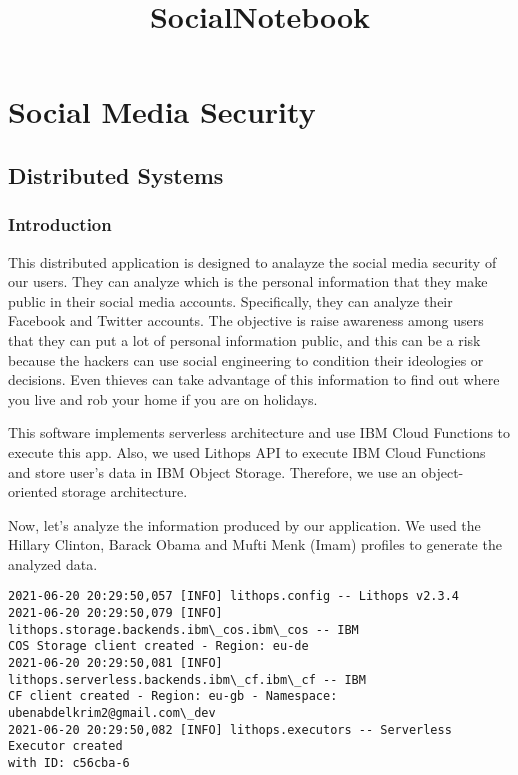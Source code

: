 \documentclass[11pt]{article}
\title{SocialNotebook}
\begin{document}
    
    \maketitle
    
    

    
    \hypertarget{social-media-security}{%
\section{Social Media Security}\label{social-media-security}}

\hypertarget{distributed-systems}{%
\subsection{Distributed Systems}\label{distributed-systems}}

\hypertarget{introduction}{%
\subsubsection{Introduction}\label{introduction}}

This distributed application is designed to analayze the social media
security of our users. They can analyze which is the personal
information that they make public in their social media accounts.
Specifically, they can analyze their Facebook and Twitter accounts. The
objective is raise awareness among users that they can put a lot of
personal information public, and this can be a risk because the hackers
can use social engineering to condition their ideologies or decisions.
Even thieves can take advantage of this information to find out where
you live and rob your home if you are on holidays.

This software implements serverless architecture and use IBM Cloud
Functions to execute this app. Also, we used Lithops API to execute IBM
Cloud Functions and store user's data in IBM Object Storage. Therefore,
we use an object-oriented storage architecture.

Now, let's analyze the information produced by our application. We used
the Hillary Clinton, Barack Obama and Mufti Menk (Imam) profiles to
generate the analyzed data.

    \begin{Verbatim}[commandchars=\\\{\}]
2021-06-20 20:29:50,057 [INFO] lithops.config -- Lithops v2.3.4
2021-06-20 20:29:50,079 [INFO] lithops.storage.backends.ibm\_cos.ibm\_cos -- IBM
COS Storage client created - Region: eu-de
2021-06-20 20:29:50,081 [INFO] lithops.serverless.backends.ibm\_cf.ibm\_cf -- IBM
CF client created - Region: eu-gb - Namespace: ubenabdelkrim2@gmail.com\_dev
2021-06-20 20:29:50,082 [INFO] lithops.executors -- Serverless Executor created
with ID: c56cba-6
    \end{Verbatim}
\end{document}
